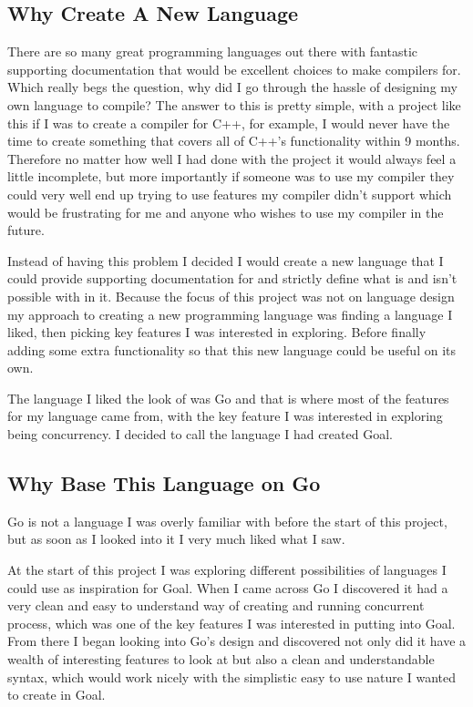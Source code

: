 \subsection{Why Create A New Language}

There are so many great programming languages out there with fantastic supporting documentation that would be excellent choices to make compilers for. Which really begs the question, why did I go through the hassle of designing my own language to compile? The answer to this is pretty simple, with a project like this if I was to create a compiler for C++, for example, I would never have the time to create something that covers all of C++'s functionality within 9 months. Therefore no matter how well I had done with the project it would always feel a little incomplete, but more importantly if someone was to use my compiler they could very well end up trying to use features my compiler didn't support which would be frustrating for me and anyone who wishes to use my compiler in the future.

Instead of having this problem I decided I would create a new language that I could provide supporting documentation for and strictly define what is and isn't possible with in it. Because the focus of this project was not on language design my approach to creating a new programming language was finding a language I liked, then picking key features I was interested in exploring. Before finally adding some extra functionality so that this new language could be useful on its own.

The language I liked the look of was Go and that is where most of the features for my language came from, with the key feature I was interested in exploring being concurrency. I decided to call the language I had created Goal.

\subsection{Why Base This Language on Go} 

Go is not a language I was overly familiar with before the start of this project, but as soon as I looked into it I very much liked what I saw. 

At the start of this project I was exploring different possibilities of languages I could use as inspiration for Goal. When I came across Go I discovered it had a very clean and easy to understand way of creating and running concurrent process, which was one of the key features I was interested in putting into Goal. From there I began looking into Go's design and discovered not only did it have a wealth of interesting features to look at but also a clean and understandable syntax, which would work nicely with the simplistic easy to use nature I wanted to create in Goal.

